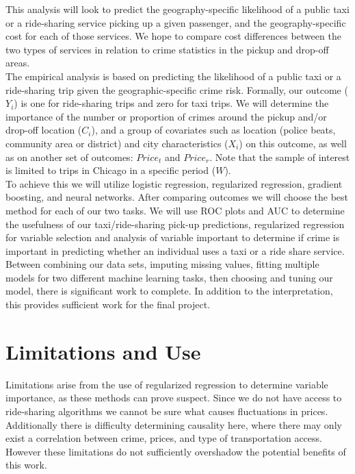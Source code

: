 \documentclass[10pt]{article}
\begin{document}
This analysis will look to predict the geography-specific likelihood of a public taxi or a ride-sharing service picking up a given passenger, and the geography-specific cost for each of those services. We hope to compare cost differences between the two types of services in relation to crime statistics in the pickup and drop-off areas.\\

The empirical analysis is based on predicting the likelihood of a public taxi or a ride-sharing trip given the geographic-specific crime risk. Formally, our outcome ($Y_i$) is one for ride-sharing trips and zero for taxi trips. We will determine the importance of the number or proportion of crimes around the pickup and/or drop-off location ($C_i$), and a group of covariates such as location (police beats, community area or district) and city characteristics ($X_i$) on this outcome, as well as on another set of outcomes: $Price_t$ and $Price_r$. Note that the sample of interest is limited to trips in Chicago in a specific period ($W$). \\

To achieve this we will utilize logistic regression, regularized regression, gradient boosting, and neural networks. After comparing outcomes we will choose the best method for each of our two tasks. We will use ROC plots and AUC to determine the usefulness of our taxi/ride-sharing pick-up predictions, regularized regression for variable selection and analysis of variable important to determine if crime is important in predicting whether an individual uses a taxi or a ride share service. \\

Between combining our data sets, imputing missing values, fitting multiple models for two different machine learning tasks, then choosing and tuning our model, there is significant work to complete. In addition to the interpretation, this provides sufficient work for the final project. \\

\section{Limitations and Use}
Limitations arise from the use of regularized regression to determine variable importance, as these methods can prove suspect. Since we do not have access to ride-sharing algorithms we cannot be sure what causes fluctuations in prices. Additionally there is difficulty determining causality here, where there may only exist a correlation between crime, prices, and type of transportation access. However these limitations do not sufficiently overshadow the potential benefits of this work.\\
\end{document}
